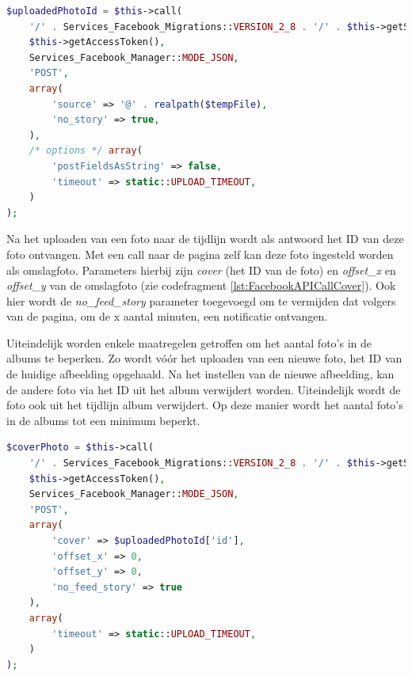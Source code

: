 \begin{lstlisting}[caption={Uploaden van een foto naar Facebook},label=lst:FacebookAPICallUpload,language=PHP]
$uploadedPhotoId = $this->call(
	'/' . Services_Facebook_Migrations::VERSION_2_8 . '/' . $this->getServiceId() . '/photos',
	$this->getAccessToken(),
	Services_Facebook_Manager::MODE_JSON,
	'POST',
	array(
		'source' => '@' . realpath($tempFile),
		'no_story' => true,
	),
	/* options */ array( 
		'postFieldsAsString' => false,
		'timeout' => static::UPLOAD_TIMEOUT,
	)
);
\end{lstlisting}


Na het uploaden van een foto naar de tijdlijn wordt als antwoord het ID van deze foto ontvangen. Met een call naar de pagina zelf kan deze foto ingesteld worden als omslagfoto. Parameters hierbij zijn \textit{cover} (het ID van de foto) en \textit{offset{\_}x} en \textit{offset{\_}y} van de omslagfoto (zie codefragment \ref{lst:FacebookAPICallCover}). Ook hier wordt de \textit{no{\_}feed{\_}story} parameter toegevoegd om te vermijden dat volgers van de pagina, om de x aantal minuten, een notificatie ontvangen. 

Uiteindelijk worden enkele maatregelen getroffen om het aantal foto's in de albums te beperken. Zo wordt v\'{o}\'{o}r het uploaden van een nieuwe foto, het ID van de huidige afbeelding opgehaald. Na het instellen van de nieuwe afbeelding, kan de andere foto via het ID uit het album verwijdert worden. Uiteindelijk wordt de foto ook uit het tijdlijn album verwijdert. Op deze manier wordt het aantal foto's in de albums tot een minimum beperkt.

\begin{lstlisting}[caption={Instellen van omslagfoto op Facebook},label=lst:FacebookAPICallCover,language=PHP]
$coverPhoto = $this->call(
	'/' . Services_Facebook_Migrations::VERSION_2_8 . '/' . $this->getServiceId(),
	$this->getAccessToken(),
	Services_Facebook_Manager::MODE_JSON,
	'POST',
	array(
		'cover' => $uploadedPhotoId['id'],
		'offset_x' => 0,
		'offset_y' => 0,
		'no_feed_story' => true
	),
	array(
		'timeout' => static::UPLOAD_TIMEOUT,
	)
);
\end{lstlisting}

